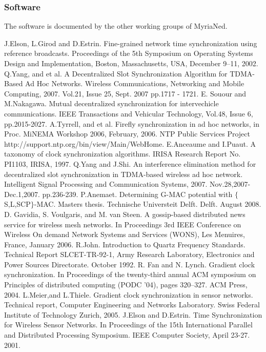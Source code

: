 \documentclass[a4paper,10pt]{report}
\begin{document}
\subsubsection{Software}
The software is documented by the other working groups of MyriaNed.
\begin{thebibliography}{\textbf{References}}
J.Elson, L.Girod and D.Estrin. Fine-grained network time synchronization using reference broadcasts. Proceedings of the 5th Symposium on Operating Systems Design and Implementation, Boston, Massachusetts, USA, December 9–11, 2002.
Q.Yang, and et al. A Decentralized Slot Synchronization Algorithm for TDMA-Based Ad Hoc Networks. Wireless Communications, Networking and Mobile Computing, 2007. Vol.21, Issue 25, Sept. 2007 pp.1717 - 1721.
E. Souour and M.Nakagawa. Mutual decentralized synchronization for intervechicle communications. IEEE Transactions and Vehicular Technology, Vol.48, Issue 6, pp.2015-2027.
A.Tyrrell, and et al. Firefly synchronization in ad hoc networks, in Proc. MiNEMA Workshop 2006, February, 2006.
NTP Public Services Project http://support.ntp.org/bin/view/Main/WebHome.
E.Anceaume and I.Puaut. A taxonomy of clock synchronization algorithms. IRISA Research Report No. PI1103, IRISA, 1997.
Q.Yang and J.Shi. An interference elimination method for decentralized slot synchronization in TDMA-based wireless ad hoc network. Intelligent Signal Processing and Communication Systems, 2007. Nov.28,2007-Dec.1,2007. pp.236-239.
 P.Anemaet. Determining G-MAC potential with $\{$S,L,SCP$\}$-MAC. Masters thesis. Technische Universteit Delft. Delft. August 2008.
D. Gavidia, S. Voulgaris, and M. van Steen. A gossip-based distributed news service for wireless mesh networks. In Proceedings 3rd IEEE Conference on Wireless On demand Network Systems and Services (WONS), Les Menuires, France, January 2006.
R.John. Introduction to Quartz Frequency Standards. Technical Report SLCET-TR-92-1, Army Research Laboratory, Electronics and Power Sources Directorate. October 1992.
R. Fan and N. Lynch. Gradient clock synchronization. In Proceedings of the twenty-third annual ACM symposium on Principles of distributed computing (PODC ’04), pages 320–327. ACM Press, 2004.
L.Meier,and L.Thiele. Gradient clock synchronization in sensor networks. Technical report, Computer Engineering and Networks Laboratory. Swiss Federal Institute of Technology Zurich, 2005.
J.Elson and D.Estrin. Time Synchronization for Wireless Sensor Networks. In Proceedings of the 15th International Parallel and Distributed Processing Symposium. IEEE Computer Society, April 23-27. 2001.

\end{thebibliography}
\end{document}
